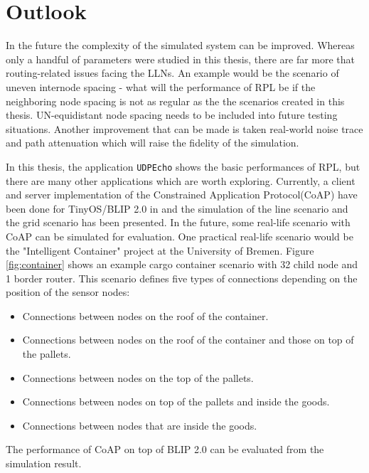\section{Outlook}
\label{outlook}

In the future the complexity of the simulated system can be improved. Whereas only a handful of parameters were studied in this thesis, there are far more that routing-related issues facing the LLNs. An example would be the scenario of uneven internode spacing - what will the performance of RPL be if the neighboring node spacing is not as regular as the the scenarios created in this thesis. UN-equidistant node spacing needs to be included into future testing situations. Another improvement that can be made is taken real-world noise trace and path attenuation which will raise the fidelity of the simulation.

In this thesis, the application \texttt{UDPEcho} shows the basic performances of RPL, but there are many other applications which are worth exploring. Currently, a client and server implementation of the
Constrained Application Protocol(CoAP) have been done for TinyOS/BLIP 2.0 in \cite{TP11} and the simulation of the line scenario and the grid scenario has been presented. In the future, some real-life scenario with CoAP can be simulated for evaluation. One practical real-life scenario would be the "Intelligent Container" project at the University of Bremen. Figure \ref{fig:container} shows an example cargo container scenario with 32 child node and 1 border router. This scenario defines five types of connections depending on the position of the sensor nodes: 
\begin{itemize}
\item Connections between nodes on the roof of the container.
\item Connections between nodes on the roof of the container and those on top of the pallets.
\item Connections between nodes on the top of the pallets.
\item Connections between nodes on top of the pallets and inside the goods.
\item Connections between nodes that are inside the goods.
\end{itemize}
The performance of CoAP on top of BLIP 2.0 can be evaluated from the simulation result.   

